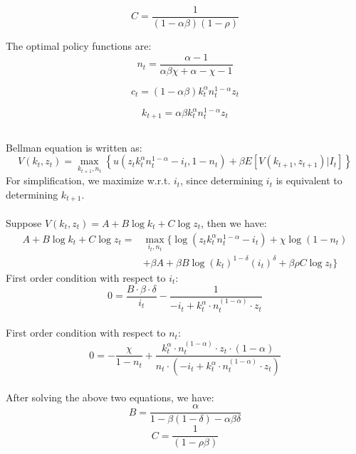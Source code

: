 \documentclass{article}
\begin{document}
\begin{equation}
    C = \frac{1}{(1-\alpha\beta)(1-\rho)}
\end{equation}

The optimal policy functions are:\\
\begin{equation}
    n_t = \frac{{\alpha - 1}}{{\alpha \beta \chi + \alpha - \chi - 1}}
\end{equation}

\begin{equation}
    c_t = (1 -\alpha \beta) k_t^\alpha n_t^{1 - \alpha} z_t
\end{equation}

\begin{equation}
    k_{t+1} = \alpha \beta k_{t}^{\alpha} n_{t}^{1 - \alpha} z_{t}
\end{equation}

\subsection{}
Bellman equation is written as:\\
\begin{equation}
    V(k_t, z_t) = \max_{k_{t+1}, n_t} \left\{ u\left(z_t k_t^\alpha n_t^{1-\alpha}-i_t, 1 - n_t\right) + \beta E[V(k_{t+1}, z_{t+1}) | I_t] \right\}
\end{equation}
For simplification, we maximize w.r.t. \(i_t\), since determining \(i_t\) is equivalent to determining \(k_{t+1}\). \\ \\
Suppose \(V(k_t, z_t) = A + B \log k_t + C \log z_t\), then we have:
\begin{align*}
    A +  B \log k_t + C \log z_t = & \max_{i_{t}, n_t} \{ \log\left(z_t k_t^\alpha n_t^{1-\alpha}-i_t\right) + \chi\log\left( 1 - n_t\right) \\
    &  + \beta A + \beta B \log (k_{t})^{1-\delta}(i_t)^\delta + \beta \rho C \log z_{t} \}
\end{align*}
First order condition with respect to \(i_t\):\\
\begin{equation}
    0 = \frac{{B \cdot \beta \cdot \delta}}{i_t} - \frac{1}{{-i_t + k_t^{\alpha} \cdot n_t^{(1 - \alpha)} \cdot z_t}}
\end{equation}\\
First order condition with respect to \(n_t\):\\
\begin{equation}
    0 = -\frac{{\chi}}{{1 - n_t}} + \frac{{k_t^{\alpha} \cdot n_t^{(1 - \alpha)} \cdot z_t \cdot (1 - \alpha)}}{{n_t \cdot (-i_t + k_t^{\alpha} \cdot n_t^{(1 - \alpha)} \cdot z_t)}}
\end{equation}\\
After solving the above two equations, we have:\\
\begin{equation}
    B = \frac{\alpha}{1-\beta(1-\delta)-\alpha\beta\delta}
\end{equation}
\begin{equation}
    C = \frac{1}{(1-\rho\beta)}
\end{equation}
\end{document}
